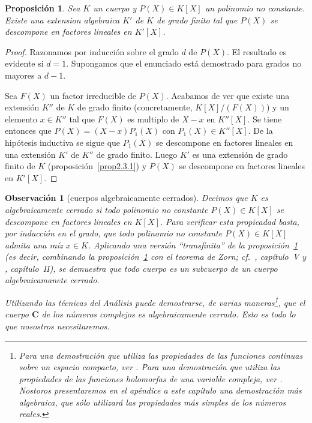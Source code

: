 \documentclass[10pt,oneside,bibtotoc,smallheadings,leqno,a5paper,DIV=12]{scrbook}
\newcommand{\CC}{\mathbf{C}}
\numberwithin{equation}{section}
\theoremstyle{defi}
\theoremstyle{enonce}
\newtheorem{proposition}{Proposici\'on}
\theoremstyle{rem}
\newtheorem*{remark*}{Observaci\'on}
\numberwithin{theorem}{section}
\numberwithin{proposition}{section}
\numberwithin{definition}{section}
\numberwithin{lemma}{section}
\numberwithin{corollary}{section}
\numberwithin{example}{section}
\numberwithin{footnote}{section}%
\begin{document}
\begin{proposition}\label{prop2.3.3}
Sea $K$ un cuerpo y $P(X)\in K[X]$ un polinomio no constante. Existe una extension algebraica $K'$ de $K$ de
grado finito tal que $P(X)$ se descompone en factores lineales en $K'[X]$.
\end{proposition}

\begin{proof}
Razonamos por inducci\'on sobre el grado $d$ de $P(X)$. El resultado es evidente si $d=1$. Supongamos que el enunciado est\'a
demostrado para grados no mayores a $d-1$.

Sea $F(X)$ un factor irreducible de $P(X)$. Acabamos de ver que existe
una extensi\'on $K''$ de $K$ de grado finito (concretamente, $K[X]/(F(X))$) y un elemento $x\in K''$ tal que
$F(X)$ es multiplo de $X-x$ en $K''[X]$. Se tiene entonces que $P(X) = (X-x)P_{1}(X)$ con $P_{1}(X)\in K''[X]$.
De la hip\'otesis inductiva se sigue que $P_{1}(X)$ se descompone en factores lineales en una extensi\'on
$K'$ de $K''$ de grado finito. Luego $K'$ es una extensi\'on de grado finito de $K$
(proposici\'on~\ref{prop2.3.1}) y
$P(X)$ se descompone en factores lineales en $K'[X]$.
\end{proof}

\begin{remark*}[cuerpos algebraicamente cerrados]
Decimos que $K$ es {\em algebraicamente cerrado}
si {\em todo} polinomio no constante $P(X)\in K[X]$ se descompone en factores lineales en $K[X]$. Para verificar
esta propieadad basta, por inducci\'on en el grado, que todo polinomio no constante $P(X)\in K[X]$ admita una
ra\'iz $x\in K$. Aplicando una versi\'on ``transfinita'' de la proposici\'on~\ref{prop2.3.3} (es decir,
combinando la proposici\'on~\ref{prop2.3.3} con el
teorema de Zorn; cf.~\cite{Bourbaki1}, cap\'itulo~V y \cite{ZariskiSamuel}, cap\'itulo~II), se demuestra que todo cuerpo
es un subcuerpo de un cuerpo algebraicamanete cerrado.

Utilizando las t\'ecnicas del An\'alisis puede demostrarse, de varias maneras\footnote{Para una demostraci\'on que utiliza las
propiedades de las funciones continuas sobre un espacio compacto, ver \cite{Choquet}. Para una demostraci\'on que utiliza
las propiedades de las funciones holomorfas de una variable compleja, ver \cite{Cartan}. Nostoros presentaremos
en el ap\'endice a este cap\'itulo una demostraci\'on m\'as algebraica, que s\'olo utilizar\'a las propiedades
m\'as simples de los n\'umeros reales.}, que el cuerpo $\CC$ de los {\em n\'umeros complejos}
es algebraicamente cerrado. Esto es todo lo que nosostros necesitaremos.
\end{remark*}
\end{document}
